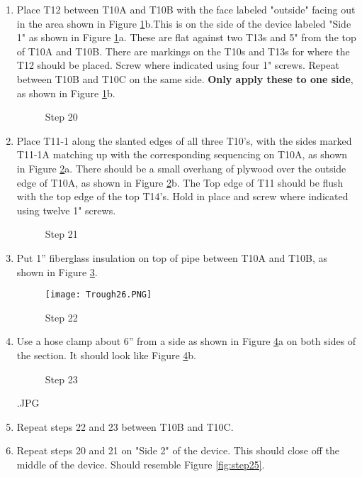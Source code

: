 \documentclass[11pt,english]{article}
\begin{document}
\begin{enumerate}
\item  Place T12 between T10A and T10B with the face labeled "outside" facing out in the area shown in Figure \ref{fig:step20}b.This is on the side of the device labeled "Side 1" as shown in Figure \ref{fig:step20}a. These are flat against two T13s and 5" from the top of T10A and T10B. There are markings on the T10s and T13s for where the T12 should be placed. Screw where indicated using four 1" screws. Repeat between T10B and T10C on the same side. \textbf{Only apply these to one side}, as shown in Figure \ref{fig:step20}b. 

\begin{figure}[ht!]%
    \centering
    \qquad
    \caption{Step 20}%
    \label{fig:step20}%
\end{figure}
\newpage
\item   Place T11-1 along the slanted edges of all three T10's, with the sides marked T11-1A matching up with the corresponding sequencing on T10A, as shown in Figure \ref{fig:step21}a.  There should be a small overhang of plywood over the outside edge of T10A, as shown in Figure \ref{fig:step21}b. The Top edge of T11 should be flush with the top edge of the top T14's. Hold in place and screw where indicated using twelve 1" screws. 

\begin{figure}[ht!]%
    \centering
    \qquad
    \caption{Step 21}%
    \label{fig:step21}%
\end{figure}
\newpage
\item   Put 1” fiberglass insulation on top of pipe between T10A and T10B, as shown in Figure \ref{fig:step22}. 

\begin{figure}[ht!]
\centering
\texttt{[image: Trough26.PNG]}
\caption{Step 22}
\label{fig:step22}
\end{figure}

\item   Use a hose clamp about 6” from a side as shown in Figure \ref{fig:step23}a on both sides of the section. It should look like Figure \ref{fig:step23}b. 

\begin{figure}[ht!]%
    \centering
    \qquad
    \caption{Step 23}%
    \label{fig:step23}%
\end{figure}
.JPG
\item   Repeat steps 22 and 23 between T10B and T10C.
\newpage\newpage
\item   Repeat steps 20 and 21 on "Side 2" of the device. This should close off the middle of the device. Should resemble Figure \ref{fig:step25}.


\end{enumerate}
\end{document}

